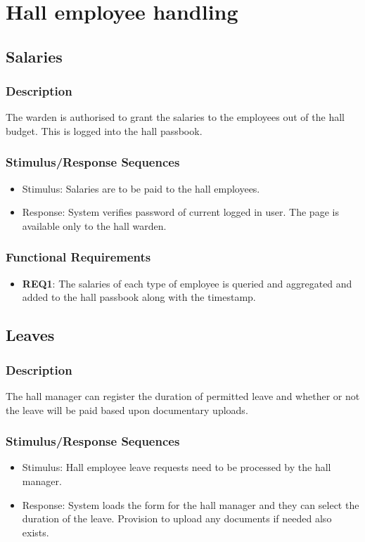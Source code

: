 \documentclass{scrreprt}
\begin{document}
\section{Hall employee handling}
\subsection{Salaries}
\subsubsection{Description}
The warden is authorised to grant the salaries to the employees out of the hall budget. This is logged into the hall passbook.
\subsubsection{Stimulus/Response Sequences}
\begin{itemize}
    \item Stimulus: Salaries are to be paid to the hall employees. 
    \item Response: System verifies password of current logged in user. The page is available only to the hall warden.
\end{itemize}

\subsubsection{Functional Requirements}
\begin{itemize}
    \item \textbf{REQ1}: The salaries of each type of employee is queried and aggregated and added to the hall passbook along with the timestamp.
\end{itemize}
\subsection{Leaves}
\subsubsection{Description}
The hall manager can register the duration of permitted leave and whether or not the leave will be paid based upon documentary uploads.
\subsubsection{Stimulus/Response Sequences}
\begin{itemize}
    \item Stimulus: Hall employee leave requests need to be processed by the hall manager.
    \item Response: System loads the form for the hall manager and they can select the duration of the leave. Provision to upload any documents if needed also exists. 
\end{itemize}
\end{document}
